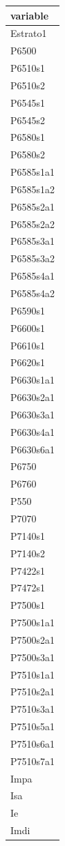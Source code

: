 
\begin{tabular}{l}
\toprule
variable\\
\midrule
Estrato1\\
P6500\\
P6510s1\\
P6510s2\\
P6545s1\\
\addlinespace
P6545s2\\
P6580s1\\
P6580s2\\
P6585s1a1\\
P6585s1a2\\
\addlinespace
P6585s2a1\\
P6585s2a2\\
P6585s3a1\\
P6585s3a2\\
P6585s4a1\\
\addlinespace
P6585s4a2\\
P6590s1\\
P6600s1\\
P6610s1\\
P6620s1\\
\addlinespace
P6630s1a1\\
P6630s2a1\\
P6630s3a1\\
P6630s4a1\\
P6630s6a1\\
\addlinespace
P6750\\
P6760\\
P550\\
P7070\\
P7140s1\\
\addlinespace
P7140s2\\
P7422s1\\
P7472s1\\
P7500s1\\
P7500s1a1\\
\addlinespace
P7500s2a1\\
P7500s3a1\\
P7510s1a1\\
P7510s2a1\\
P7510s3a1\\
\addlinespace
P7510s5a1\\
P7510s6a1\\
P7510s7a1\\
Impa\\
Isa\\
\addlinespace
Ie\\
Imdi\\

\end{tabular}

